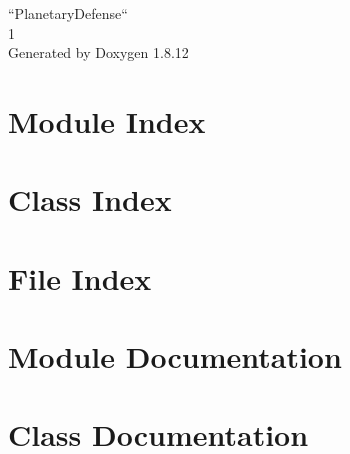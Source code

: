 \documentclass[twoside]{book}
\newcommand{\+}{\discretionary{\mbox{\scriptsize$\hookleftarrow$}}{}{}}
\newcommand{\clearemptydoublepage}{%
  \newpage{\pagestyle{empty}\cleardoublepage}%
}
\begin{document}
\hypersetup{pageanchor=false,
             bookmarksnumbered=true,
             pdfencoding=unicode
            }
\begin{titlepage}
\vspace*{7cm}
\begin{center}%
{\Large “\+Planetary\+Defense“ \\[1ex]\large 1 }\\
\vspace*{1cm}
{\large Generated by Doxygen 1.8.12}\\
\end{center}
\end{titlepage}
\clearemptydoublepage
{}
\tableofcontents
\clearemptydoublepage
{}
\hypersetup{pageanchor=true}

\chapter{Module Index}

\chapter{Class Index}

\chapter{File Index}

\chapter{Module Documentation}















\chapter{Class Documentation}














\end{document}
